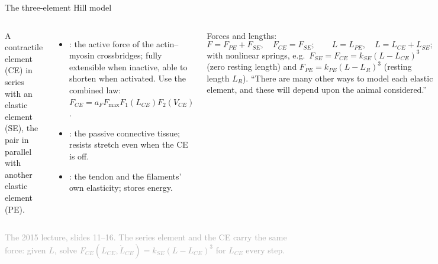 \documentclass[aspectratio=169,11pt]{beamer}
\newcommand{\sourcecredit}[1]{\vfill\hfill{\tiny\textcolor{DarkGray}{#1}}}
\begin{document}
\begin{frame}{The three-element Hill model}
\label{fr:hill3}
\begin{columns}[T]
\centering
{}
\footnotesize
A contractile element (CE) in series with an elastic element (SE), the pair in parallel with another elastic element (PE).
\begin{itemize}
  \item {}: the active force of the actin--myosin crossbridges; fully extensible when inactive, able to shorten when activated. Use the combined law: $F_{CE} = a_F F_{\max} F_1(L_{CE}) F_2(V_{CE})$.
  \item {}: the passive connective tissue; resists stretch even when the CE is off.
  \item {}: the tendon and the filaments' own elasticity; stores energy.
\end{itemize}
Forces and lengths:
\[ F = F_{PE} + F_{SE}, \quad F_{CE} = F_{SE}; \qquad L = L_{PE}, \quad L = L_{CE} + L_{SE}; \]
with nonlinear springs, e.g.\ $F_{SE} = F_{CE} = k_{SE}(L - L_{CE})^3$ (zero resting length) and $F_{PE} = k_{PE}(L - L_R)^3$ (resting length $L_R$). ``There are many other ways to model each elastic element, and these will depend upon the animal considered.''
\end{columns}
\sourcecredit{The 2015 lecture, slides 11--16. The series element and the CE carry the same force: given $L$, solve $F_{CE}(L_{CE}, \dot L_{CE}) = k_{SE}(L - L_{CE})^3$ for $L_{CE}$ every step.}
\end{frame}
\end{document}
